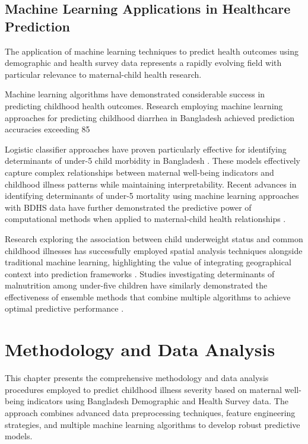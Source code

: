 \documentclass[12pt]{report}
\begin{document}
\section{Machine Learning Applications in Healthcare Prediction}

The application of machine learning techniques to predict health outcomes using demographic and health survey data represents a rapidly evolving field with particular relevance to maternal-child health research.

Machine learning algorithms have demonstrated considerable success in predicting childhood health outcomes. Research employing machine learning approaches for predicting childhood diarrhea in Bangladesh achieved prediction accuracies exceeding 85%

Logistic classifier approaches have proven particularly effective for identifying determinants of under-5 child morbidity in Bangladesh \cite{ref4, ref9}. These models effectively capture complex relationships between maternal well-being indicators and childhood illness patterns while maintaining interpretability. Recent advances in identifying determinants of under-5 mortality using machine learning approaches with BDHS data have further demonstrated the predictive power of computational methods when applied to maternal-child health relationships \cite{ref14}.

Research exploring the association between child underweight status and common childhood illnesses has successfully employed spatial analysis techniques alongside traditional machine learning, highlighting the value of integrating geographical context into prediction frameworks \cite{ref11}. Studies investigating determinants of malnutrition among under-five children have similarly demonstrated the effectiveness of ensemble methods that combine multiple algorithms to achieve optimal predictive performance \cite{ref10}.


\chapter{Methodology and Data Analysis}

This chapter presents the comprehensive methodology and data analysis procedures employed to predict childhood illness severity based on maternal well-being indicators using Bangladesh Demographic and Health Survey data. The approach combines advanced data preprocessing techniques, feature engineering strategies, and multiple machine learning algorithms to develop robust predictive models.
\end{document}
